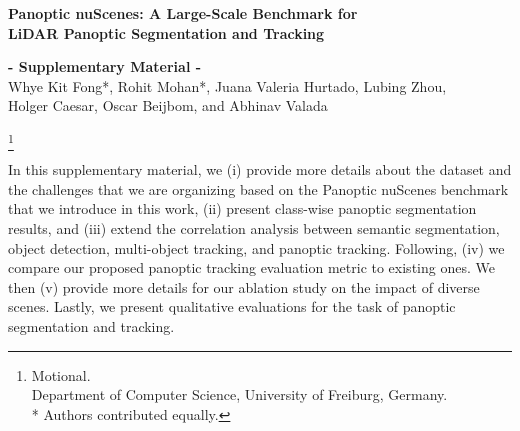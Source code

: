 \documentclass[letterpaper, 10 pt, journal, twoside]{IEEEtran}
\renewcommand{\thefootnote}{\fnsymbol{footnote}}
\renewcommand{\baselinestretch}{0.99}
\begin{document}
\typeout{}
\footnotesize



\clearpage
\renewcommand{\baselinestretch}{1}
\setlength{\belowcaptionskip}{0pt}

\begin{strip}
\begin{center}
\vspace{-5ex}
\textbf{\LARGE \bf
Panoptic nuScenes: A Large-Scale Benchmark for\\\vspace{0.5ex}LiDAR Panoptic Segmentation and Tracking} \\
\vspace{2ex}

\Large{\bf- Supplementary Material -}\\
\vspace{0.4cm}
\normalsize{Whye Kit Fong*, Rohit Mohan*, Juana Valeria Hurtado, Lubing Zhou,\\ Holger Caesar, Oscar Beijbom, and Abhinav Valada}
\end{center}
\end{strip}

\setcounter{section}{0}
\setcounter{equation}{0}
\setcounter{figure}{0}
\setcounter{table}{0}
\setcounter{page}{1}
\makeatletter

\renewcommand{\thesection}{S.\arabic{section}}
\renewcommand{\thesubsection}{S.\arabic{subsection}}
\renewcommand{\thetable}{S.\arabic{table}}
\renewcommand{\thefigure}{S.\arabic{figure}}



\let\thefootnote\relax\footnote{ Motional.\\
 Department of Computer Science, University of Freiburg, Germany.\\
* Authors contributed equally.}

\normalsize

In this supplementary material, we (i) provide more details about the dataset and the challenges that we are organizing based on the Panoptic nuScenes benchmark that we introduce in this work, (ii) present class-wise panoptic segmentation results, and (iii) extend the correlation analysis between semantic segmentation, object detection, multi-object tracking, and panoptic tracking. Following, (iv) we compare our proposed panoptic tracking evaluation metric to existing ones. We then (v) provide more details for our ablation study on the impact of diverse scenes. Lastly, we present qualitative evaluations for the task of panoptic segmentation and tracking.
\end{document}
